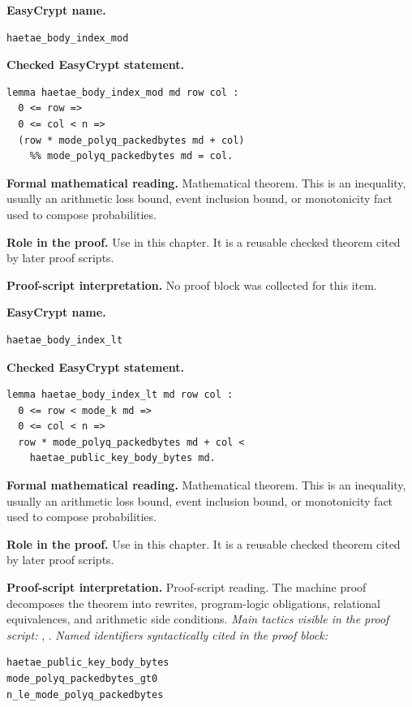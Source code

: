 \begin{formaltheorem}
\noindent\textbf{EasyCrypt name.}
\begin{lstlisting}[language=EasyCrypt,basicstyle=\ttfamily\scriptsize]
haetae_body_index_mod
\end{lstlisting}
\noindent\textbf{Checked EasyCrypt statement.}
\begin{lstlisting}[language=EasyCrypt,basicstyle=\ttfamily\scriptsize]
lemma haetae_body_index_mod md row col :
  0 <= row =>
  0 <= col < n =>
  (row * mode_polyq_packedbytes md + col)
    %% mode_polyq_packedbytes md = col.
\end{lstlisting}
\noindent\textbf{Formal mathematical reading.}
Mathematical theorem. This is an inequality, usually an arithmetic loss bound, event inclusion bound, or monotonicity fact used to compose probabilities.

\noindent\textbf{Role in the proof.}
Use in this chapter. It is a reusable checked theorem cited by later proof scripts.

\noindent\textbf{Proof-script interpretation.}
No proof block was collected for this item.

\end{formaltheorem}

\begin{formaltheorem}
\noindent\textbf{EasyCrypt name.}
\begin{lstlisting}[language=EasyCrypt,basicstyle=\ttfamily\scriptsize]
haetae_body_index_lt
\end{lstlisting}
\noindent\textbf{Checked EasyCrypt statement.}
\begin{lstlisting}[language=EasyCrypt,basicstyle=\ttfamily\scriptsize]
lemma haetae_body_index_lt md row col :
  0 <= row < mode_k md =>
  0 <= col < n =>
  row * mode_polyq_packedbytes md + col <
    haetae_public_key_body_bytes md.
\end{lstlisting}
\noindent\textbf{Formal mathematical reading.}
Mathematical theorem. This is an inequality, usually an arithmetic loss bound, event inclusion bound, or monotonicity fact used to compose probabilities.

\noindent\textbf{Role in the proof.}
Use in this chapter. It is a reusable checked theorem cited by later proof scripts.

\noindent\textbf{Proof-script interpretation.}
Proof-script reading. The machine proof decomposes the theorem into rewrites, program-logic obligations, relational equivalences, and arithmetic side conditions.
\emph{Main tactics visible in the proof script:} , .
\emph{Named identifiers syntactically cited in the proof block:}
\begin{lstlisting}[language=EasyCrypt,basicstyle=\ttfamily\scriptsize]
haetae_public_key_body_bytes
mode_polyq_packedbytes_gt0
n_le_mode_polyq_packedbytes
\end{lstlisting}

\end{formaltheorem}

